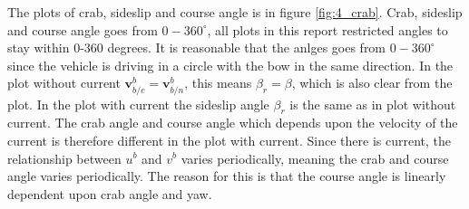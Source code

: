The plots of crab, sideslip and course angle is in figure \ref{fig:4_crab}. Crab, sideslip and course angle goes from $0-360^\circ$, all plots in this report restricted angles to stay within 0-360 degrees. It is reasonable that  the anlges goes from $0-360^\circ$ since the vehicle is driving in a circle with the bow  in the same direction. In the plot without current $\mathbf{v}^b_{b/c} = \mathbf{v}^b_{b/n} $, this means $\beta_r = \beta$, which is also clear from the plot. In the plot with current the sideslip angle $\beta_r$ is the same as in plot without current. The crab angle and course angle which depends upon the velocity of the current is therefore different in the plot with current. Since there is current, the relationship between $u^b$ and $v^b$ varies periodically, meaning the crab and course angle varies periodically. The reason for this is that the course angle  is linearly dependent upon crab angle and yaw. 

